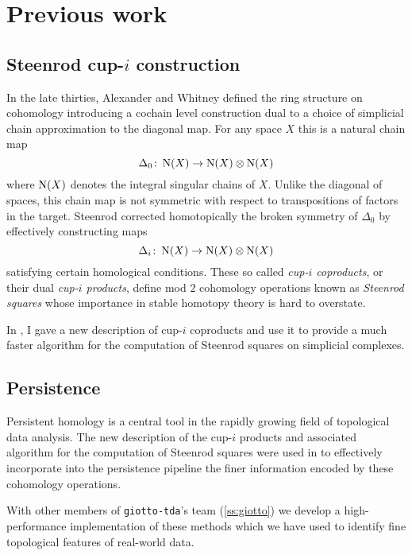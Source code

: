 
\section{Previous work}

\subsection{Steenrod cup-$i$ construction}

In the late thirties, Alexander and Whitney defined the ring structure on cohomology introducing a cochain level construction dual to a choice of simplicial chain approximation to the diagonal map.
For any space $X$ this is a natural chain map
\[
\Delta_0 \colon \operatorname{N}(X) \to \operatorname{N}(X) \otimes \operatorname{N}(X)
\]
where $\operatorname{N}(X)$ denotes the integral singular chains of $X$.
Unlike the diagonal of spaces, this chain map is not symmetric with respect to transpositions of factors in the target.
Steenrod \cite{steenrod1947products} corrected homotopically the broken symmetry of $\Delta_0$ by effectively constructing maps
\begin{equation*}
\Delta_i \colon \operatorname{N}(X) \to \operatorname{N}(X) \otimes \operatorname{N}(X)
\end{equation*}
satisfying certain homological conditions.
These so called \textit{cup-$i$ coproducts}, or their dual \textit{cup-$i$ products}, define mod $2$ cohomology operations known as \textit{Steenrod squares} whose importance in stable homotopy theory is hard to overstate.

In \cite{medina2021newformulas}, I gave a new description of cup-$i$ coproducts and use it to provide a much faster algorithm for the computation of Steenrod squares on simplicial complexes.

\subsection{Persistence}

Persistent homology is a central tool in the rapidly growing field of topological data analysis.
The new description of the cup-$i$ products and associated algorithm for the computation of Steenrod squares were used in \cite{medina2018persistence} to effectively incorporate into the persistence pipeline the finer information encoded by these cohomology operations.

With other members of \texttt{giotto-tda}'s team (\cref{ss:giotto}) we develop a high-performance implementation of these methods which we have used to identify fine topological features of real-world data.

